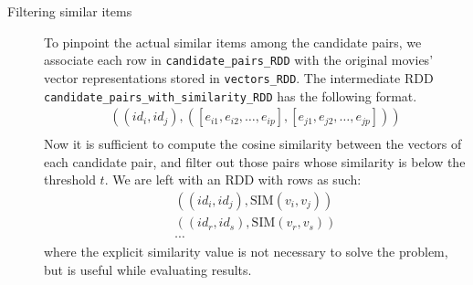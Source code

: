 \begin{description}
    \item [Filtering similar items] To pinpoint the actual similar items among the candidate pairs, we associate each row in \texttt{candidate\_pairs\_RDD} with the original movies' vector representations stored in \texttt{vectors\_RDD}. The intermediate RDD \texttt{candidate\_pairs\_with\_similarity\_RDD} has the following format.
        $$\begin{array}{c}
            ((id_i, id_j), ([e_{i1}, e_{i2}, \dots, e_{ip}], [e_{j1}, e_{j2}, \dots, e_{jp}]))\\
        \end{array}$$
    Now it is sufficient to compute the cosine similarity between the vectors of each candidate pair, and filter out those pairs whose similarity is below the threshold $t$. We are left with an RDD with rows as such:
        $$\begin{array}{c}
           ((id_i, id_j), \text{SIM}(v_i, v_j)) \\
           ((id_r, id_s), \text{SIM}(v_r, v_s)) \\
           \cdots
        \end{array}$$
    where the explicit similarity value is not necessary to solve the problem, but is useful while evaluating results.

\end{description}

